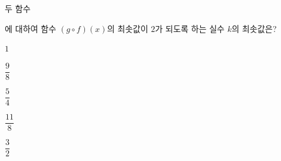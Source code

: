두 함수 \par\smallskip{}\par\smallskip\noindent 에 대하여 함수 $(g\circ f)(x)$의 최솟값이 $2$가 되도록 하는 실수 $k$의 최솟값은?
\begin{choices32}{\rule[-3ex]{0pt}{8ex}$1$}{\rule[-3ex]{0pt}{8ex}$\dfrac{9}{8}$}{\rule[-3ex]{0pt}{8ex}$\dfrac{5}{4}$}{\rule[-3ex]{0pt}{8ex}$\dfrac{11}{8}$}{\rule[-3ex]{0pt}{8ex}$\dfrac{3}{2}$}\end{choices32}
